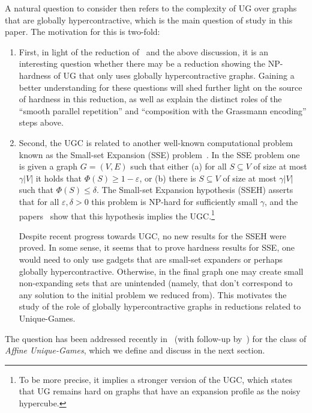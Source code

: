 \documentclass[11pt]{article}
\def \eps {{\varepsilon}}
\theoremstyle{definition}
\begin{document}
A natural question to consider then refers to the 
complexity of UG over graphs that are
globally hypercontractive, which is the main question 
of study in this paper. The motivation for this 
is two-fold:
\begin{enumerate}
    \item First, in light of 
the reduction of~\cite{KhotMS17,DBLP:conf/stoc/DinurKKMS18a,DinurKKMS18,KhotMS18} and the above discussion, it is an interesting 
question whether there may be a reduction showing the NP-hardness of UG that only uses globally hypercontractive graphs. Gaining a better understanding for these questions will shed further
light on the source of hardness in this reduction, as well as explain the distinct roles of the ``smooth parallel repetition'' and ``composition with the Grassmann encoding'' steps above.

\item Second, the UGC is related to another well-known computational problem known as the Small-set Expansion (SSE) problem~\cite{RaghavendraS10,RaghavendraST12}. In the SSE problem one is given a graph $G = (V,E)$ such that either (a) for all $S\subseteq V$ of size at most $\gamma|V|$ it holds that $\Phi(S)\geq 1-\eps$, or (b) there is $S\subseteq V$ of size at most $\gamma|V|$ such that $\Phi(S)\leq \delta$. The
Small-set Expansion hypothesis (SSEH) asserts that for all $\eps,\delta>0$
this problem is NP-hard for sufficiently small $\gamma$, and the 
papers~\cite{RaghavendraS10,RaghavendraST12} show that this 
hypothesis implies the UGC.\footnote{To be more precise, it implies
a stronger version of the UGC, which states that UG 
remains hard on graphs that have an expansion profile
as the noisy hypercube.} 

Despite recent progress towards UGC, no new results for the SSEH were proved. In some sense, it seems that to prove hardness results for SSE, one would need 
to only use gadgets that are small-set expanders or perhaps globally hypercontractive. Otherwise, in the final graph one may create small non-expanding sets that are unintended (namely, that don't correspond to any solution to the 
initial problem we reduced from). This motivates the study of the role of globally hypercontractive graphs in reductions related to Unique-Games.
\end{enumerate}

The question has been addressed recently in~\cite{BBKSS} (with 
follow-up by~\cite{DBLP:conf/soda/BafnaHKL22}) for the class of \emph{Affine 
Unique-Games}, which we define and discuss in the next section.
\end{document}
